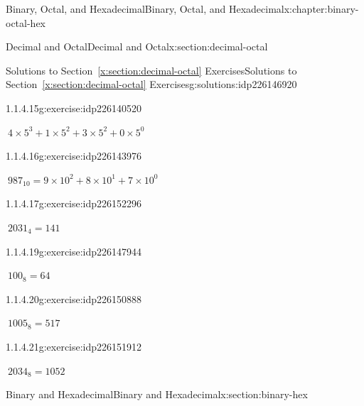 \documentclass[twoside,10pt,]{book}
\newcommand{\xreffont}{\relax}
\numberwithin{equation}{section}
\begin{document}
\begin{chapterptx}{Binary, Octal, and Hexadecimal}{}{Binary, Octal, and Hexadecimal}{}{}{x:chapter:binary-octal-hex}
\begin{sectionptx}{Decimal and Octal}{}{Decimal and Octal}{}{}{x:section:decimal-octal}
\begin{solutions-subsection}{Solutions to Section~{\xreffont\ref*{x:section:decimal-octal}} Exercises}{}{Solutions to Section~{\xreffont\ref*{x:section:decimal-octal}} Exercises}{}{}{g:solutions:idp226146920}
\begin{exercisegroup}
\begin{divisionsolutioneg}{1.1.4.15}{}{g:exercise:idp226140520}%
\par\smallskip%
\noindent\hypertarget{g:solution:idp226140904-main}{}\(\ 4\times5^3+1\times5^2+3\times5^2+0\times5^0\)\end{divisionsolutioneg}%
\begin{divisionsolutioneg}{1.1.4.16}{}{g:exercise:idp226143976}%
\par\smallskip%
\noindent\hypertarget{g:solution:idp226139496-main}{}\(\ 987_{10}=9\times10^2+8\times10^1+7\times10^0\)\end{divisionsolutioneg}%
\end{exercisegroup}
\par\medskip\noindent
\begin{exercisegroup}
\begin{divisionsolutioneg}{1.1.4.17}{}{g:exercise:idp226152296}%
\par\smallskip%
\noindent\hypertarget{g:solution:idp226149608-main}{}\(\ 2031_4=141\)\end{divisionsolutioneg}%
\begin{divisionsolutioneg}{1.1.4.19}{}{g:exercise:idp226147944}%
\par\smallskip%
\noindent\hypertarget{g:solution:idp226154216-main}{}\(\ 100_8=64\)\end{divisionsolutioneg}%
\begin{divisionsolutioneg}{1.1.4.20}{}{g:exercise:idp226150888}%
\par\smallskip%
\noindent\hypertarget{g:solution:idp226147304-main}{}\(\ 1005_8=517\)\end{divisionsolutioneg}%
\begin{divisionsolutioneg}{1.1.4.21}{}{g:exercise:idp226151912}%
\par\smallskip%
\noindent\hypertarget{g:solution:idp226150760-main}{}\(\ 2034_8=1052\)\end{divisionsolutioneg}%
\end{exercisegroup}
\par\medskip\noindent
\end{solutions-subsection}
\end{sectionptx}
%
%
\typeout{************************************************}
\typeout{************************************************}
%
\begin{sectionptx}{Binary and Hexadecimal}{}{Binary and Hexadecimal}{}{}{x:section:binary-hex}
%
%
\typeout{************************************************}

\end{sectionptx}
\end{chapterptx}
\end{document}
